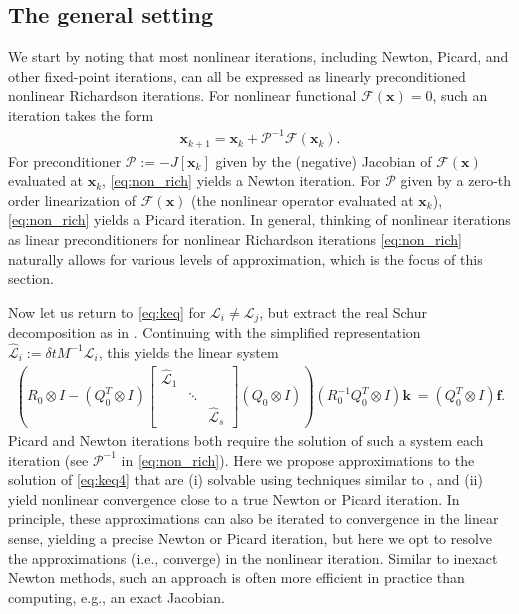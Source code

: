 \documentclass[review]{siamart}
\begin{document}
\subsection{The general setting}\label{sec:nonlinear:gen}

We start by noting that most nonlinear iterations, including Newton, Picard, and
other fixed-point iterations, can all be expressed as linearly preconditioned
nonlinear Richardson iterations. For nonlinear functional
$\mathcal{F}(\mathbf{x}) = 0$, such an iteration takes the form
%
\begin{align}\label{eq:non_rich}
\mathbf{x}_{k+1} = \mathbf{x}_k + \mathcal{P}^{-1}\mathcal{F}(\mathbf{x}_k).
\end{align}
%
For preconditioner $\mathcal{P} := -J[\mathbf{x}_k]$ given by the (negative)
Jacobian of $\mathcal{F}(\mathbf{x})$ evaluated at $\mathbf{x}_k$, \eqref{eq:non_rich}
yields a Newton iteration. For $\mathcal{P}$ given by a zero-th order linearization
of $\mathcal{F}(\mathbf{x})$ (the nonlinear operator evaluated at $\mathbf{x}_k$),
\eqref{eq:non_rich} yields a Picard iteration. In general, thinking of nonlinear
iterations as linear preconditioners for nonlinear Richardson iterations
\eqref{eq:non_rich} naturally allows for various levels of approximation,
which is the focus of this section. 

Now let us return to \eqref{eq:keq} for $\mathcal{L}_i\neq\mathcal{L}_j$, but
extract the real Schur decomposition as in . Continuing
with the simplified representation $\widehat{\mathcal{L}}_i := \delta t M^{-1}\mathcal{L}_i$,
this yields the linear system
%
\begin{align}\label{eq:keq4}
\left( R_0\otimes I - (Q_0^T\otimes I) \begin{bmatrix}
	\widehat{\mathcal{L}}_1  & \\ & \ddots \\ && \widehat{\mathcal{L}}_s\end{bmatrix}
	(Q_0\otimes I)\right) (R_0^{-1}Q_0^T\otimes I) \mathbf{k}\
= (Q_0^T\otimes I)\mathbf{f}.
\end{align}
%
Picard and Newton iterations both require the solution of such a system each
iteration (see $\mathcal{P}^{-1}$ in \eqref{eq:non_rich}). Here we propose 
approximations to the solution of \eqref{eq:keq4} that are (i) solvable using
techniques similar to \Cref{sec:nonlinear:simp}, and (ii) yield nonlinear 
convergence close to a true Newton or Picard iteration. In principle, these
approximations can also be iterated to convergence in the linear sense, yielding
a precise Newton or Picard iteration, but here we opt to resolve the approximations
(i.e., converge) in the nonlinear iteration. Similar to inexact Newton methods,
such an approach is often more efficient in practice than computing, e.g., an exact
Jacobian. 
\end{document}
